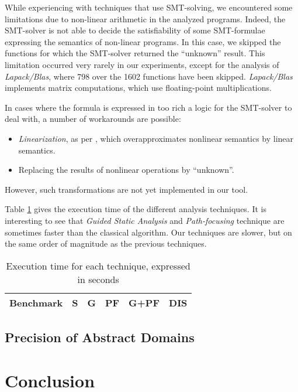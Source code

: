 \documentclass[preprint]{sigplanconf}
\begin{document}
While experiencing with techniques that use SMT-solving, we encountered some
limitations due to non-linear arithmetic in the analyzed programs. Indeed, 
the SMT-solver is not able to decide the satisfiability of some SMT-formulae
expressing the semantics of non-linear programs. 
In this case, we skipped the functions for which the SMT-solver returned the
``unknown'' result.
This limitation occurred very rarely in our experiments, except for the analysis
of \emph{Lapack/Blas}, where 798 over the 1602 functions have been skipped.
\emph{Lapack/Blas} implements matrix computations, which use floating-point multiplications.

In cases where the formula is expressed in too rich a logic for the SMT-solver to deal with, a number of workarounds are possible:
\begin{itemize}
\item \emph{Linearization}, as per \citet{DBLP:conf/vmcai/Mine06}, which overapproximates nonlinear semantics by linear semantics.
\item Replacing the results of nonlinear operations by ``unknown''.
\end{itemize}
However, such transformations are not yet implemented in our tool.

Table \ref{tab:time} gives the execution time of the different analysis
techniques. It is interesting to see that \emph{Guided Static Analysis} and
\emph{Path-focusing} technique are sometimes faster than the classical
algorithm. Our techniques are slower, but on the same order of magnitude as
the previous techniques.

\begin{table}[!h]
	\centering
\begin{tabular}{|l|r|r|r|r|r|} \hline
	Benchmark & \textbf{S} & \textbf{G} & \textbf{PF} & \textbf{G+PF} &
	\textbf{DIS} \\ \hline
	 \hline
\end{tabular}
\caption{Execution time for each technique, expressed in seconds}
\label{tab:time}
\end{table}


\subsection{Precision of Abstract Domains}


\section{Conclusion}
\end{document}
